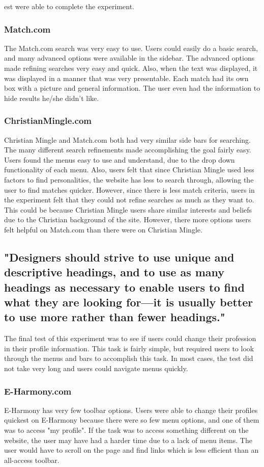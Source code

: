 \documentclass{article}
\begin{document}
est were able to complete the experiment. 

\subsubsection{Match.com}
The Match.com search was very easy to use. Users could easily do a basic search, and many advanced options were available in the sidebar. The advanced options made refining searches very easy and quick. Also, when the text was displayed, it was displayed in a manner that was very presentable. Each match had its own box with a picture and general information. The user even had the information to hide results he/she didn't like. 

\subsubsection{ChristianMingle.com}
Christian Mingle and Match.com both had very similar side bars for searching. The many different search refinements made accomplishing the goal fairly easy. Users found the menus easy to use and understand, due to the drop down functionality of each menu. Also, users felt that since Christian Mingle used less factors to find personalities, the website has less to search through, allowing the user to find matches quicker. However, since there is less match criteria, users in the experiment felt that they could not refine searches as much as they want to. This could be because Christian Mingle users share similar interests and beliefs due to the Christian background of the site. However, there more options users felt helpful on Match.com than there were on Christian Mingle. 

\subsection{"Designers should strive to use unique and descriptive headings, and 
to use as many headings as necessary to enable users to find what 
they are looking for—it is usually better to use more rather than fewer 
headings."}

The final test of this experiment was to see if users could change their profession in their profile information. This task is fairly simple, but required users to look through the menus and bars to accomplish this task. In most cases, the test did not take very long and users could navigate menus quickly.

\subsubsection{E-Harmony.com}
E-Harmony has very few toolbar options. Users were able to change their profiles quickest on E-Harmony because there were so few menu options, and one of them was to access "my profile". If the task was to access something different on the website, the user may have had a harder time due to a lack of menu items. The user would have to scroll on the page and find links which is less efficient than an all-access toolbar.
\end{document}
